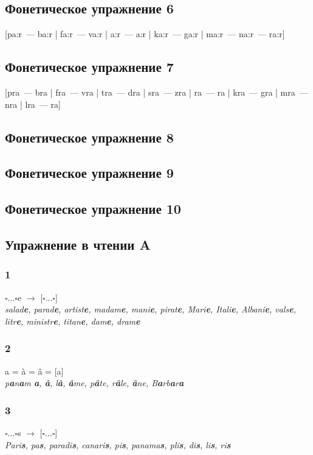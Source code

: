 \documentclass[10pt, oneside]{article}   	%
\begin{document}
\subsection{Фонетическое упражнение 6}
[pa:r~--- ba:r | fa:r~--- va:r | {\textesh}a:r~--- {\textyogh}a:r | ka:r~--- ga:r | ma:r~--- na:r~--- ra:r]
\subsection{Фонетическое упражнение 7}
[pra~--- bra | fra~--- vra | tra~--- dra | sra~--- zra | {\textesh}ra~--- {\textyogh}ra | kra~--- gra | mra~--- nra | lra~--- ra]
\subsection{Фонетическое упражнение 8}
\subsection{Фонетическое упражнение 9}
\subsection{Фонетическое упражнение 10}

\subsection{Упражнение в чтении A}
\subsubsection{1}
$\square$...$\square$e $\to$ [$\square$...$\square$]\\
\slshape salad{\bfseries e}, parad{\bfseries e}, artist{\bfseries e}, madam{\bfseries e}, mani{\bfseries e}, pirat{\bfseries e}, Mari{\bfseries e}, Itali{\bfseries e}, Albani{\bfseries e}, vals{\bfseries e}, litr{\bfseries e}, ministr{\bfseries e}, titan{\bfseries e}, dam{\bfseries e}, dram{\bfseries e}
\upshape

\subsubsection{2}
a = à = â = [a]\\
\slshape p{\bfseries a}n{\bfseries a}m {\bfseries a}, {\bfseries à}, l{\bfseries à}, {\bfseries â}me, p{\bfseries â}te, r{\bfseries â}le, {\bfseries â}ne, B{\bfseries a}rb{\bfseries a}r{\bfseries a}
\upshape

\subsubsection{3}
$\square$...$\square$s $\to$ [$\square$...$\square$]\\
\slshape Pari{\bfseries s}, pa{\bfseries s}, paradi{\bfseries s}, canari{\bfseries s}, pi{\bfseries s}, panama{\bfseries s}, pli{\bfseries s}, di{\bfseries s}, li{\bfseries s},  ri{\bfseries s}
\upshape
\end{document}
